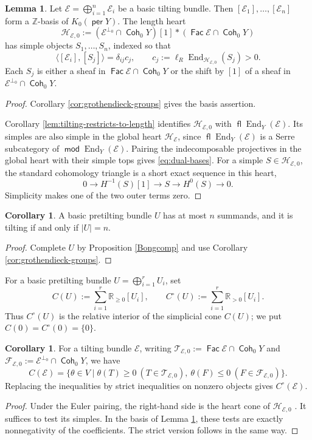 \documentclass[a4paper,reqno]{amsart}
\def\E{\mathcal{E}}
\def\F{\mathcal{F}}
\def\H{\mathcal{H}}
\def\T{\mathcal{T}}
\DeclareMathOperator{\md}{\mathsf{mod}}
\renewcommand{\mod}{\md}
\DeclareMathOperator{\fl}{\mathsf{fl}}
\DeclareMathOperator{\Fac}{\mathsf{Fac}}
\DeclareMathOperator{\Coh}{\mathsf{Coh}}
\DeclareMathOperator{\per}{\mathsf{per}}
\DeclareMathOperator{\End}{End}
\theoremstyle{definition}
\newtheorem{Lem}[Thm]{Lemma}
\newtheorem{Cor}[Thm]{Corollary}
\begin{document}
\begin{Lem}\label{lem:euler-dual-bases}
Let $\E=\bigoplus_{i=1}^n\E_i$ be a basic tilting bundle. Then $[\E_1],\ldots,[\E_n]$ form a $\mathbb Z$-basis of $K_0(\per Y)$. The length heart
\[
\H_{\E,0}:=(\E^{\perp_0}\cap\Coh_0Y)[1]*(\Fac\E\cap\Coh_0Y)
\]
has simple objects $S_1,\ldots,S_n$, indexed so that
\begin{equation}\label{eq:dual-bases}
\langle[\E_i],[S_j]\rangle=\delta_{ij}c_j,
\qquad c_j:=\ell_R\End_{\H_{\E,0}}(S_j)>0.
\end{equation}
Each $S_j$ is either a sheaf in $\Fac\E\cap\Coh_0Y$ or the shift by $[1]$ of a sheaf in $\E^{\perp_0}\cap\Coh_0Y$.
\end{Lem}
\begin{proof}
Corollary \ref{cor:grothendieck-groups} gives the basis assertion.

Corollary \ref{lem:tilting-restricts-to-length} identifies $\H_{\E,0}$ with $\fl\End_Y(\E)$. Its simples are also simple in the global heart $\H_\E$, since $\fl\End_Y(\E)$ is a Serre subcategory of $\mod\End_Y(\E)$. Pairing the indecomposable projectives in the global heart with their simple tops gives \eqref{eq:dual-bases}. For a simple $S\in\H_{\E,0}$, the standard cohomology triangle is a short exact sequence in this heart,
\[
0\longrightarrow H^{-1}(S)[1]\longrightarrow S\longrightarrow H^0(S)\longrightarrow0.
\]
Simplicity makes one of the two outer terms zero.
\end{proof}

\begin{Cor}\label{cor:number-of-summands}
A basic pretilting bundle $U$ has at most $n$ summands, and it is tilting if and only if $|U|=n$.
\end{Cor}
\begin{proof}
Complete $U$ by Proposition \ref{Bongcomp} and use Corollary \ref{cor:grothendieck-groups}.
\end{proof}

For a basic pretilting bundle $U=\bigoplus_{i=1}^rU_i$, set
\begin{equation}\label{eq:pretilting-cone}
C(U):=\sum_{i=1}^r\mathbb R_{\ge0}[U_i],
\qquad C^\circ(U):=\sum_{i=1}^r\mathbb R_{>0}[U_i].
\end{equation}
Thus $C^\circ(U)$ is the relative interior of the simplicial cone $C(U)$; we put $C(0)=C^\circ(0)=\{0\}$.

\begin{Cor}\label{cor:cone-from-heart}
For a tilting bundle $\E$, writing $\T_{\E,0}:=\Fac\E\cap\Coh_0Y$ and $\F_{\E,0}:=\E^{\perp_0}\cap\Coh_0Y$, we have
\[
C(\E)=\{\theta\in V\mid\theta(T)\ge0\ (T\in\T_{\E,0}),\ \theta(F)\le0\ (F\in\F_{\E,0})\}.
\]
Replacing the inequalities by strict inequalities on nonzero objects gives $C^\circ(\E)$.
\end{Cor}
\begin{proof}
Under the Euler pairing, the right-hand side is the heart cone of $\H_{\E,0}$ \cite[Definition 2.2]{BPPW24}. It suffices to test its simples. In the basis of Lemma \ref{lem:euler-dual-bases}, these tests are exactly nonnegativity of the coefficients. The strict version follows in the same way.
\end{proof}
\end{document}
